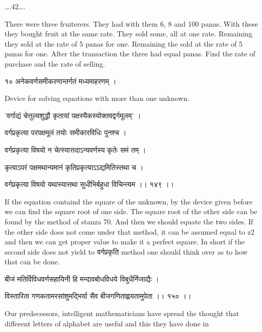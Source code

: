 \documentclass[]{article}
\date{}
\begin{document}
{\ldots{}.42\ldots{}.}

{There were three fruiterers. They had with them 6, 8 and 100 panas.
With these they bought fruit at the same rate. They sold some, all at
one rate. Remaining they sold at the rate of 5 panas for one. Remaining
the sold at the rate of 5 panas for one. After the transaction the three
had equal panas. Find the rate of purchase and the rate of selling.}

{१० अनेकवर्णसमीकरणान्तर्गतं मध्यमाहरणम् । }

{Device for solving equations with more than one unknown.}

{'वर्गाद्यं चेत्तुल्यशुद्धौ कृतायां पक्षस्यैकस्योक्तवद्वर्गमूलम्' । }

{वर्गप्रकृत्या परपक्षमूलं तयोः समीकारविधिः पुनश्च । }

{वर्गप्रकृत्या विषयो न चेत्स्यात्तदाऽन्यवर्णस्य कृतेः समं तम् । }

{कृत्वाऽपरं पक्षमथान्यमानं कृतिप्रकृत्याऽऽद्यमितिस्तथा च । }

{वर्गप्रकृत्या विषयो यथास्यात्तथा सुधीभिर्बहुधा विचिन्त्यम ।। १४९ ।। }

{If the equation containd the square of the unknown, by the device given
before we can find the square root of one side. The square root of the
other side can be found by the method of stanza 70. And then we should
equate the two sides. If the other side does not come under that method,
it can be assumed equal to z}{2}{ and then we can get proper value to
make it a perfect square. In short if the second side does not yield to
वर्गप्रकृति method one should think over as to how that can be done.}

{बीजं मतिर्विविधवर्णसहायिनी हि मन्दावबोधविधये विबुधैर्निजाद्यैः । }

{विस्तारिता गणकतामरसांशुमद्भिर्या सैव बीजगणिताह्वयतामुपेता ।। १५० ।। }

{Our predecessors, intelligent mathematicians have spread the thought
that different letters of alphabet are useful and this they have done
in\\
}
\end{document}

